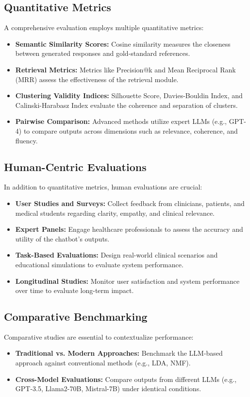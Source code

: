 \subsection{Quantitative Metrics}
A comprehensive evaluation employs multiple quantitative metrics:
\begin{itemize}
    \item \textbf{Semantic Similarity Scores:} Cosine similarity measures the closeness between generated responses and gold-standard references.
    \item \textbf{Retrieval Metrics:} Metrics like Precision@k and Mean Reciprocal Rank (MRR) assess the effectiveness of the retrieval module.
    \item \textbf{Clustering Validity Indices:} Silhouette Score, Davies-Bouldin Index, and Calinski-Harabasz Index evaluate the coherence and separation of clusters.
    \item \textbf{Pairwise Comparison:} Advanced methods utilize expert LLMs (e.g., GPT-4) to compare outputs across dimensions such as relevance, coherence, and fluency.
\end{itemize}

\subsection{Human-Centric Evaluations}
In addition to quantitative metrics, human evaluations are crucial:
\begin{itemize}
    \item \textbf{User Studies and Surveys:} Collect feedback from clinicians, patients, and medical students regarding clarity, empathy, and clinical relevance.
    \item \textbf{Expert Panels:} Engage healthcare professionals to assess the accuracy and utility of the chatbot’s outputs.
    \item \textbf{Task-Based Evaluations:} Design real-world clinical scenarios and educational simulations to evaluate system performance.
    \item \textbf{Longitudinal Studies:} Monitor user satisfaction and system performance over time to evaluate long-term impact.
\end{itemize}

\subsection{Comparative Benchmarking}
Comparative studies are essential to contextualize performance:
\begin{itemize}
    \item \textbf{Traditional vs. Modern Approaches:} Benchmark the LLM-based approach against conventional methods (e.g., LDA, NMF).
    \item \textbf{Cross-Model Evaluations:} Compare outputs from different LLMs (e.g., GPT-3.5, Llama2-70B, Mistral-7B) under identical conditions.
\end{itemize}


